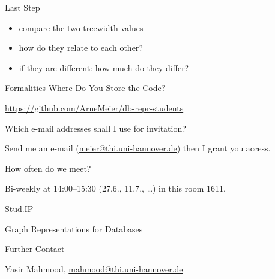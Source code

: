 \documentclass[aspectratio=169]{beamer}
\begin{document}
\begin{frame}{Last Step}
\begin{itemize}
	\item compare the two treewidth values
	\item how do they relate to each other?
	\item if they are different: how much do they differ?
\end{itemize}
\end{frame}



\begin{frame}{Formalities}
\alert{Where Do You Store the Code?}

\url{https://github.com/ArneMeier/db-repr-students}\bigskip

\alert{Which e-mail addresses shall I use for invitation?}

Send me an e-mail (\url{meier@thi.uni-hannover.de}) then I grant you access. \bigskip

\alert{How often do we meet?} 

Bi-weekly at 14:00--15:30 (27.6., 11.7., \dots) in this room 1611.\bigskip

\alert{Stud.IP}

Graph Representations for Databases\bigskip

\alert{Further Contact}

Yasir Mahmood, \url{mahmood@thi.uni-hannover.de}


\end{frame}
\end{document}
